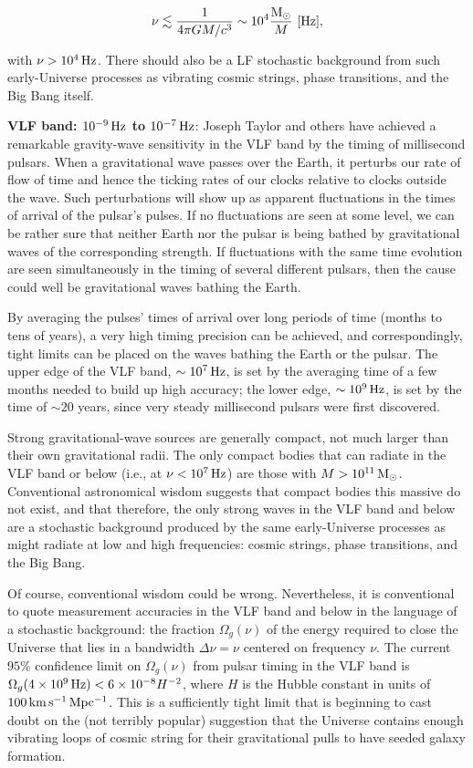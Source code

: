 \documentclass[a4paper,10pt]{article}
\begin{document}
\begin{align*}
    \nu \lesssim \frac{1}{4\pi GM/c^3} \sim 10^4 \frac{\rm M_\odot}{M} ~ [{\rm Hz}],
\end{align*}

{\noindent}with $\nu>10^4\,{\rm Hz}$. There should also be a LF stochastic background from such early-Universe processes as vibrating cosmic strings, phase transitions, and the Big Bang itself.

{\noindent}\textbf{VLF band: $10^{-9}\,{\rm Hz}$ to $10^{-7}\,{\rm Hz}$}: Joseph Taylor and others have achieved a remarkable gravity-wave sensitivity in the VLF band by the timing of millisecond pulsars. When a gravitational wave passes over the Earth, it perturbs our rate of flow of time and hence the ticking rates of our clocks relative to clocks outside the wave. Such perturbations will show up as apparent fluctuations in the times of arrival of the pulsar's pulses. If no fluctuations are seen at some level, we can be rather sure that neither Earth nor the pulsar is being bathed by gravitational waves of the corresponding strength. If fluctuations with the same time evolution are seen simultaneously in the timing of several different pulsars, then the cause could well be gravitational waves bathing the Earth.

{\noindent}By averaging the pulses' times of arrival over long periods of time (months to tens of years), a very high timing precision can be achieved, and correspondingly, tight limits can be placed on the waves bathing the Earth or the pulsar. The upper edge of the VLF band, $\sim10^7\,{\rm Hz}$, is set by the averaging time of a few months needed to build up high accuracy; the lower edge, $\sim10^9\,{\rm Hz}$, is set by the time of $\sim20$ years, since very steady millisecond pulsars were first discovered.

{\noindent}Strong gravitational-wave sources are generally compact, not much larger than their own gravitational radii. The only compact bodies that can radiate in the VLF band or below (i.e., at $\nu<10^7\,{\rm Hz}$) are those with $M>10^{11}\,{\rm M_\odot}$. Conventional astronomical wisdom suggests that compact bodies this massive do not exist, and that therefore, the only strong waves in the VLF band and below are a stochastic background produced by the same early-Universe processes as might radiate at low and high frequencies: cosmic strings, phase transitions, and the Big Bang.

{\noindent}Of course, conventional wisdom could be wrong. Nevertheless, it is conventional to quote measurement accuracies in the VLF band and below in the language of a stochastic background: the fraction $\Omega_g(\nu)$ of the energy required to close the Universe that lies in a bandwidth $\Delta\nu=\nu$ centered on frequency $\nu$. The current $95\%$ confidence limit on  $\Omega_g(\nu)$ from pulsar timing in the VLF band is  $\Omega_g(4\times10^9\,{\rm Hz})<6\times10^{-8}H^{-2}$, where $H$ is the Hubble constant in units of $100\,{\rm km\,s^{-1}\,Mpc^{-1}}$. This is a sufficiently tight limit that is beginning to cast doubt on the (not terribly popular) suggestion that the Universe contains enough vibrating loops of cosmic string for their gravitational pulls to have seeded galaxy formation.
\end{document}

